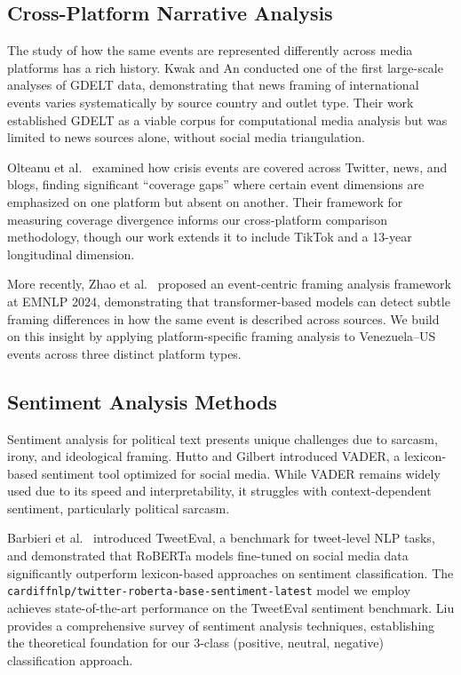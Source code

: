 \documentclass[12pt, letterpaper]{article}
\begin{document}
\subsection{Cross-Platform Narrative Analysis}

The study of how the same events are represented differently across media platforms has a rich history. Kwak and An \cite{kwak2016gdelt} conducted one of the first large-scale analyses of GDELT data, demonstrating that news framing of international events varies systematically by source country and outlet type. Their work established GDELT as a viable corpus for computational media analysis but was limited to news sources alone, without social media triangulation.

Olteanu et al.\ \cite{olteanu2015coverage} examined how crisis events are covered across Twitter, news, and blogs, finding significant ``coverage gaps'' where certain event dimensions are emphasized on one platform but absent on another. Their framework for measuring coverage divergence informs our cross-platform comparison methodology, though our work extends it to include TikTok and a 13-year longitudinal dimension.

More recently, Zhao et al.\ \cite{zhao2024framing} proposed an event-centric framing analysis framework at EMNLP 2024, demonstrating that transformer-based models can detect subtle framing differences in how the same event is described across sources. We build on this insight by applying platform-specific framing analysis to Venezuela--US events across three distinct platform types.

\subsection{Sentiment Analysis Methods}

Sentiment analysis for political text presents unique challenges due to sarcasm, irony, and ideological framing. Hutto and Gilbert \cite{hutto2014vader} introduced VADER, a lexicon-based sentiment tool optimized for social media. While VADER remains widely used due to its speed and interpretability, it struggles with context-dependent sentiment, particularly political sarcasm.

Barbieri et al.\ \cite{barbieri2020tweeteval} introduced TweetEval, a benchmark for tweet-level NLP tasks, and demonstrated that RoBERTa models fine-tuned on social media data significantly outperform lexicon-based approaches on sentiment classification. The \texttt{cardiffnlp/twitter-roberta-base-sentiment-latest} model we employ achieves state-of-the-art performance on the TweetEval sentiment benchmark. Liu \cite{liu2012survey} provides a comprehensive survey of sentiment analysis techniques, establishing the theoretical foundation for our 3-class (positive, neutral, negative) classification approach.
\end{document}
